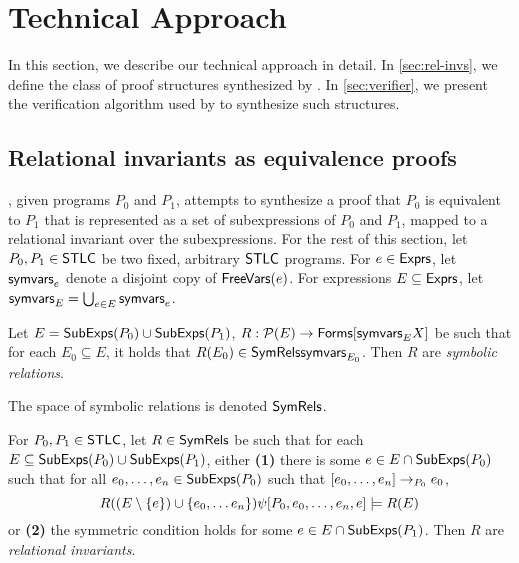 \section{Technical Approach}
%
In this section, we describe our technical approach in detail.
%
In \autoref{sec:rel-invs}, we define the class of proof
structures synthesized by \sys.
%
In \autoref{sec:verifier}, we present the verification algorithm used
by \sys to synthesize such structures.

\subsection{Relational invariants as equivalence proofs}
\label{sec:rel-invs}
%
\sys, given programs $P_0$ and $P_1$, attempts to synthesize a proof
that $P_0$ is equivalent to $P_1$ that is represented as a set of
subexpressions of $P_0$ and $P_1$, mapped to a relational invariant
over the subexpressions.
%
For the rest of this section, let $P_0, P_1 \in \mathsf{STLC}$ be two fixed,
arbitrary $\mathsf{STLC}$ programs.
%
For $e \in \mathsf{Exprs}$, let $\mathsf{symvars}_{e}$ denote a disjoint copy of
$\mathsf{FreeVars}(e)$.
%
For expressions $E \subseteq \mathsf{Exprs}$, let $\mathsf{symvars}_{E} = \bigcup_{e
  \in E} \mathsf{symvars}_{e}$.

\begin{defn}
  \label{defn:sym-rels}
  Let $E = \mathsf{SubExps}(P_0) \cup \mathsf{SubExps}(P_1)$,
  $R: \mathcal{P}(E) \to \mathsf{Forms}[  \mathsf{symvars}_{E}  X]$ be such that %
  for each $E_0 \subseteq E$, %
  it holds that $R(E_0) \in \mathsf{SymRels}{ \mathsf{symvars}_{E_0} }$.
  Then $R$ are \emph{symbolic relations}.
\end{defn}
%
The space of symbolic relations is denoted $\mathsf{SymRels}$.

\begin{defn}
  \label{defn:rel-invs}
  For $P_0, P_1 \in \mathsf{STLC}$, let $R \in \mathsf{SymRels}$ be such that %
  for each $E \subseteq \mathsf{SubExps}(P_0) \cup \mathsf{SubExps}(P_1)$, either %
  \textbf{(1)} there is some $e \in E \cap \mathsf{SubExps}(P_0)$
  such that for all $e_0, \ldots, e_n \in \mathsf{SubExps}(P_0)$ such that %
  $[ e_0, \ldots, e_n ] \rightarrow_{ P_0 } e_0$, 
  \[ R( (E  \setminus \{  e  \}) \cup \{  e_0, \ldots e_n  \} )
  \psi[ P_0,  e_0, \ldots, e_n ,  e  ] \models 
  R(E)
  \]
  or \textbf{(2)} the symmetric condition holds for some $e \in E
  \cap \mathsf{SubExps}(P_1)$.
  Then $R$ are \emph{relational invariants}.
\end{defn}
%

